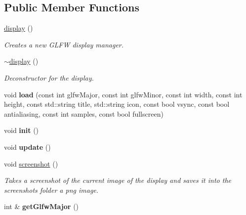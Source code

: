 \subsection*{Public Member Functions}
\begin{DoxyCompactItemize}
\item 
\hyperlink{classflounder_1_1display_ac0a3910222a928f1fc60193cd65c0530}{display} ()
\begin{DoxyCompactList}\small\item\em Creates a new G\+L\+FW display manager. \end{DoxyCompactList}\item 
\hyperlink{classflounder_1_1display_a272f9080af9079cbb3890b18c3e4d394}{$\sim$display} ()
\begin{DoxyCompactList}\small\item\em Deconstructor for the display. \end{DoxyCompactList}\item 
\mbox{\label{classflounder_1_1display_a78e07792dd8cf4beb15105d9c1684cfe}} 
void {\bfseries load} (const int glfw\+Major, const int glfw\+Minor, const int width, const int height, const std\+::string title, std\+::string icon, const bool vsync, const bool antialiasing, const int samples, const bool fullscreen)
\item 
\mbox{\label{classflounder_1_1display_adc7a2890c7089ce9e058afa2f8fc9b5c}} 
void {\bfseries init} ()
\item 
\mbox{\label{classflounder_1_1display_a3ba18c2ab1d02fb943ad112b35d3ea75}} 
void {\bfseries update} ()
\item 
void \hyperlink{classflounder_1_1display_af27b3f93977c32c79ad9522672e484c5}{screenshot} ()
\begin{DoxyCompactList}\small\item\em Takes a screenshot of the current image of the display and saves it into the screenshots folder a png image. \end{DoxyCompactList}\item 
\mbox{\label{classflounder_1_1display_acb43834a6c2c274e9a94153d17c6282f}} 
int \& {\bfseries get\+Glfw\+Major} ()
\item 
\mbox{\label{classflounder_1_1display_a2ae2dfe06f903b17ab77a907dadbc38a}} 

\end{DoxyCompactItemize}
